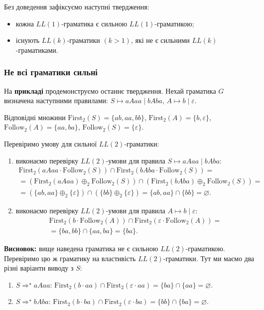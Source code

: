 Без доведення зафіксуємо наступні твердження:
\begin{itemize}
	\item кожна $LL(1)$-граматика є сильною $LL(1)$-граматикою;
	\item існують $LL(k)$-граматики $(k > 1)$, які не є сильними $LL(k)$-граматиками.
\end{itemize}

\subsubsection{Не всі граматики сильні}

На \textbf{прикладі} продемонструємо останнє твердження. Нехай граматика $G$ визначена наступними правилами: $S \mapsto aAaa \mid bAba$, $A \mapsto b \mid \varepsilon$. \medskip

Відповідні множини $\text{First}_2(S) = \{ab, aa, bb\}$, $\text{First}_2(A) = \{b, \varepsilon\}$, $\text{Follow}_2(A) = \{aa, ba\}$, $\text{Follow}_2(S) = \{\varepsilon\}$. \medskip

Перевіримо умову для сильної $LL(2)$-граматики:
\begin{enumerate}
	\item  виконаємо перевірку $LL(2)$-умови для правила $S \mapsto aAaa \mid bAba$:
	\begin{multline*}
		\text{First}_2(aAaa \cdot \text{Follow}_2(S)) \cap \text{First}_2(bAba \cdot \text{Follow}_2(S)) = \\
		= (\text{First}_2(aAaa) \oplus_2 \text{Follow}_2(S)) \cap (\text{First}_2(bAba) \oplus_2 \text{Follow}_2(S)) = \\
		= (\{ab, aa\} \oplus_2 \{\varepsilon\}) \cap (\{bb\} \oplus_2 \{\varepsilon\}) = \{ab,aa\}\cap \{bb\} = \varnothing.
	\end{multline*}
	\item виконаємо перевірку $LL(2)$-умови для правила $A \mapsto b \mid \varepsilon$:
	\begin{multline*}
		\text{First}_2(b \cdot \text{Follow}_2(A)) \cap \text{First}_2(\varepsilon \cdot \text{Follow}_2(A)) = \\
		= \{ba,bb\}\cap\{aa,ba\}=\{ba\}.
	\end{multline*}
\end{enumerate}

\textbf{Висновок:} вище наведена граматика не є сильною $LL(2)$-граматикою. Перевіримо цю ж граматику на властивість $LL(2)$-граматики. Тут ми маємо два різні варіанти виводу з $S$:
\begin{enumerate}
	\item $S \Rightarrow^\star aAaa$: $\text{First}_2(b \cdot aa) \cap \text{First}_2(\varepsilon \cdot aa) = \{ba\} \cap \{aa\} = \varnothing$.
	\item $S \Rightarrow^\star bAba$: $\text{First}_2(b \cdot ba) \cap \text{First}_2(\varepsilon \cdot ba) = \{bb\} \cap \{ba\} = \varnothing$.
\end{enumerate}

